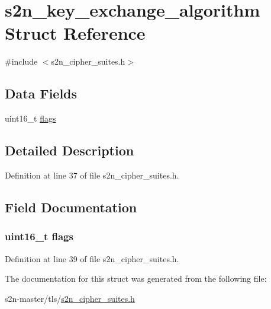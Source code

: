 \hypertarget{structs2n__key__exchange__algorithm}{}\section{s2n\+\_\+key\+\_\+exchange\+\_\+algorithm Struct Reference}
\label{structs2n__key__exchange__algorithm}


{\ttfamily \#include $<$s2n\+\_\+cipher\+\_\+suites.\+h$>$}

\subsection*{Data Fields}
\begin{DoxyCompactItemize}
\item 
uint16\+\_\+t \hyperlink{structs2n__key__exchange__algorithm_a1e87af3c18a2fd36c61faf89949bdc3f}{flags}
\end{DoxyCompactItemize}


\subsection{Detailed Description}


Definition at line 37 of file s2n\+\_\+cipher\+\_\+suites.\+h.



\subsection{Field Documentation}
\subsubsection[{\texorpdfstring{flags}{flags}}]{\setlength{\rightskip}{0pt plus 5cm}uint16\+\_\+t flags}\hypertarget{structs2n__key__exchange__algorithm_a1e87af3c18a2fd36c61faf89949bdc3f}{}\label{structs2n__key__exchange__algorithm_a1e87af3c18a2fd36c61faf89949bdc3f}


Definition at line 39 of file s2n\+\_\+cipher\+\_\+suites.\+h.



The documentation for this struct was generated from the following file\+:\begin{DoxyCompactItemize}
\item 
s2n-\/master/tls/\hyperlink{s2n__cipher__suites_8h}{s2n\+\_\+cipher\+\_\+suites.\+h}\end{DoxyCompactItemize}
